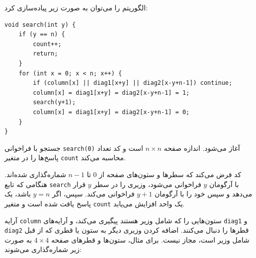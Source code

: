 \begin{samepage}
الگوریتم را می‌توان به صورت زیر پیاده‌سازی کرد:
\begin{lstlisting}
void search(int y) {
    if (y == n) {
        count++;
        return;
    }
    for (int x = 0; x < n; x++) {
        if (column[x] || diag1[x+y] || diag2[x-y+n-1]) continue;
        column[x] = diag1[x+y] = diag2[x-y+n-1] = 1;
        search(y+1);
        column[x] = diag1[x+y] = diag2[x-y+n-1] = 0;
    }
}
\end{lstlisting}
\end{samepage}
جستجو با فراخوانی \texttt{search(0)} آغاز می‌شود.
اندازه صفحه $n \times n$ است
و کد تعداد پاسخ‌ها را در متغیر \texttt{count} محاسبه می‌کند.

کد فرض می‌کند که سطرها و ستون‌های
صفحه از 0 تا $n-1$ شماره‌گذاری شده‌اند.
هنگامی که تابع \texttt{search} با آرگومان $y$ فراخوانی می‌شود،
وزیری را در سطر $y$ قرار می‌دهد
و سپس خود را با آرگومان $y+1$ فراخوانی می‌کند.
سپس، اگر $y=n$ باشد، یک پاسخ یافت شده است
و متغیر \texttt{count} یک واحد افزایش می‌یابد.

آرایه \texttt{column} ستون‌هایی را که شامل وزیر هستند پیگیری می‌کند،
و آرایه‌های \texttt{diag1} و \texttt{diag2}
قطرها را دنبال می‌کنند.
اضافه کردن وزیری دیگر به ستون یا قطری که از قبل شامل وزیر است،
مجاز نیست.
برای مثال، ستون‌ها و قطرهای
صفحه $4 \times 4$ به صورت زیر شماره‌گذاری می‌شوند:

